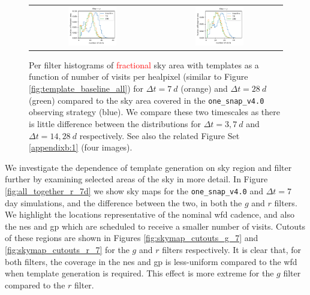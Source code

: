 \documentclass[preprintm,linenumbers]{aastex631}
\newcommand{\baseline}{\texttt{one\_snap\_v4.0}\xspace}
\providecommand{\red}[1]{\textcolor{red}{#1}}
\begin{document}
\begin{figure}
\begin{tabular}{c c}
				\includegraphics[width=0.4\textwidth]{results/histograms/hist_first_year_one_snap_v4_0_10yrs_db_noDD_noTwi_CountMetric_doAllTemplateMetrics_reduceCount_z_noDD_noTwi.pdf} &
				\includegraphics[width=0.4\textwidth]{results/histograms/hist_first_year_one_snap_v4_0_10yrs_db_noDD_noTwi_CountMetric_doAllTemplateMetrics_reduceCount_y_noDD_noTwi.pdf} \\
			\end{tabular}
			\caption{
				Per filter histograms of \red{fractional} sky area with templates as a function of number of visits per healpixel (similar to Figure \ref{fig:template_baseline_all}) for $\Delta t = 7\ \si{d}$ (orange) and $\Delta t = 28\ \si{d}$ (green) compared to the sky area covered in the \baseline observing strategy (blue).
    We compare these two timescales as there is little difference between the distributions for $\Delta t = 3, 7\ \si{d}$ and $\Delta t = 14, 28\ \si{d}$ respectively.
   See also the related Figure Set \ref{appendixb:1} (four images).
			}
			\label{fig:template_baseline_histograms7_28d}
		\end{figure}


We investigate the dependence of template generation on sky region and filter further by examining selected areas of the sky in more detail.
In Figure \ref{fig:all_together_r_7d} we show sky maps for the \baseline and $\Delta t  =7$ day simulations, and the difference between the two, in both the $g$ and $r$ filters. 
We highlight the locations representative of the nominal \gls*{wfd} cadence, and also the \gls*{nes} and \gls*{gp} which are scheduled to receive a smaller number of visits.
Cutouts of these regions are shown in Figures \ref{fig:skymap_cutouts_g_7} and \ref{fig:skymap_cutouts_r_7} for the $g$ and $r$ filters respectively.
It is clear that, for both filters, the coverage in the \gls*{nes} and \gls*{gp} is less-uniform compared to the \gls*{wfd} when template generation is required.
This effect is more extreme for the $g$ filter compared to the $r$ filter.
\end{document}
